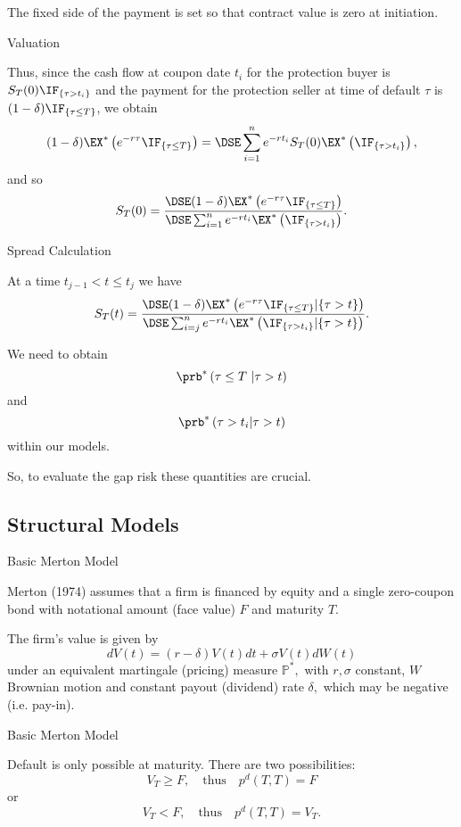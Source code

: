 	The fixed side
of the payment is set so that contract value is zero at
initiation.






{Valuation}

Thus, since the cash flow at coupon date $t_i$ for the protection
buyer is $S_T(0)\IF_{\{\tau>t_i\}}$ and the payment for the protection
seller at time of default $\tau$ is $(1-\delta)\IF_{\{\tau\leq
T\}}$, we obtain
$$
(1-\delta)\EX^*\left(e^{-r\tau}\IF_{\{\tau\leq
T\}}\right) = \DSE\sum_{i=1}^n e^{-rt_i} S_T(0)\EX^*\left(\IF_{\{\tau
>t_i\}}\right),
$$
and so
$$
S_T(0)=\frac{\DSE (1-\delta)\EX^*\left(e^{-r\tau}\IF_{\{\tau\leq
T\}}\right)} {\DSE\sum_{i=1}^n e^{-rt_i} \EX^*\left(\IF_{\{\tau
>t_i\}}\right)}.
$$

{Spread Calculation}






	At a time $t_{j-1} < t \leq t_j$ we have
$$
S_T(t)=\frac{\DSE (1-\delta)\EX^*\left(e^{-r\tau}\IF_{\{\tau\leq
T\} }  | \{\tau >t\}\right)} {\DSE\sum_{i=j}^n e^{-rt_i} \EX^*\left(\IF_{\{\tau
>t_i\}}| \{\tau >t\}\right)}.
$$

	We need to obtain
$$\prb^*\left(\tau\leq T\ | \tau >t \right)$$ and
$$\prb^*\left(\tau >t_i | \tau >t\right)$$ within our models.

	So, to evaluate the gap risk these quantities are crucial.  %

\subsection{Structural Models}

{Basic Merton Model}

Merton (1974)
assumes that a firm is financed by
equity and a single zero-coupon bond with notational amount (face
value) $F$ and maturity $T$.

The firm's value is given by
$$
dV(t) = (r-\delta) V(t)  dt + \sigma V(t) dW(t)
$$
under an equivalent martingale (pricing) measure $\mathbb{P^*},$ with $r,
\sigma$ constant, $W$ Brownian motion and constant payout
(dividend) rate $\delta,$ which may be negative (i.e. pay-in).

{Basic Merton Model}

Default is only possible at maturity. There are two possibilities:
$$
V_T \geq F, \quad \mbox{thus} \quad p^d(T,T)=F
$$
or
$$
V_T < F, \quad \mbox{thus} \quad p^d(T,T)=V_T.
$$

